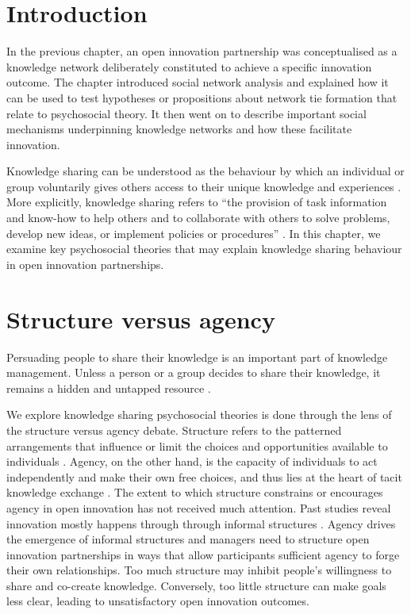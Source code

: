 
\section{Introduction}

In the previous chapter, an open innovation partnership was conceptualised as a knowledge network deliberately constituted to achieve a specific innovation outcome. The chapter introduced social network analysis and explained how it can be used to test hypotheses or propositions about network tie formation that relate to psychosocial theory. It then went on to describe important social mechanisms underpinning knowledge networks and how these facilitate innovation. 

Knowledge sharing can be understood as the behaviour by which an individual or group voluntarily gives others access to their unique knowledge and experiences \citep{cabrera2002knowledge,hansen2005share}. More explicitly, knowledge sharing refers to \enquote{the provision of task information and know-how to help others and to collaborate with others to solve problems, develop new ideas, or implement policies or procedures} \citep{wang2010knowledge}. In this chapter, we examine key psychosocial theories that may explain knowledge sharing behaviour in open innovation partnerships. \medskip

\section{Structure versus agency}

Persuading people to share their knowledge is an important part of knowledge management. Unless a person or a group decides to share their knowledge, it remains a hidden and untapped resource \citep{davenport1998working}. 

 We explore knowledge sharing psychosocial theories is done through the lens of the structure versus agency debate. Structure refers to the patterned arrangements that influence or limit the choices and opportunities available to individuals \citep{bandura1999social}. Agency, on the other hand, is the capacity of individuals to act independently and make their own free choices, and thus lies at the heart of tacit knowledge exchange \citep{leonard1998role,barker2016cultural}. The extent to which structure constrains or encourages agency in open innovation has not received much attention. Past studies reveal innovation mostly happens through through informal structures \citep{allen1977role,ibarra1993network}. Agency drives the emergence of informal structures and managers need to structure open innovation partnerships in ways that allow participants sufficient agency to forge their own relationships. Too much structure may inhibit people's willingness to share and co-create knowledge. Conversely, too little structure can make goals less clear, leading to unsatisfactory open innovation outcomes. \medskip

